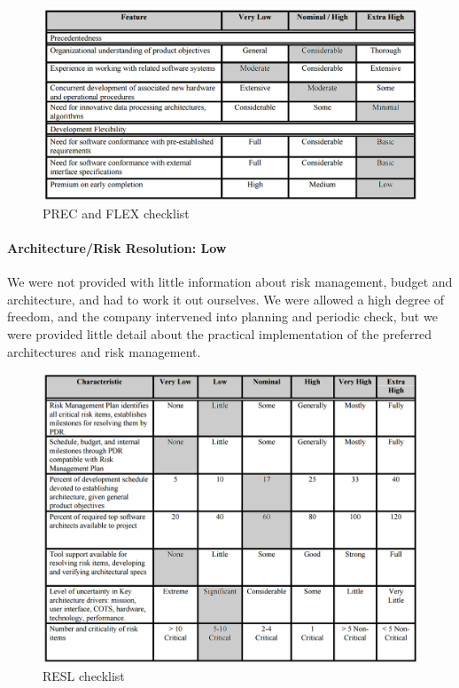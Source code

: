 \begin{figure}[h!]
	\centering
	\includegraphics[width=\textwidth]{Images/PREC_FLEX}
	\caption{PREC and FLEX checklist}
\end{figure}

\paragraph*{Architecture/Risk Resolution: Low}
We were not provided with little information about risk management, budget and architecture, and had to work it out ourselves. We were allowed a high degree of freedom, and the company intervened into planning and periodic check, but we were provided little detail about the practical implementation of the preferred architectures and risk management.

\begin{figure}[h!]
	\centering
	\includegraphics[width=\textwidth]{Images/RESL}
	\caption{RESL checklist}
\end{figure}

